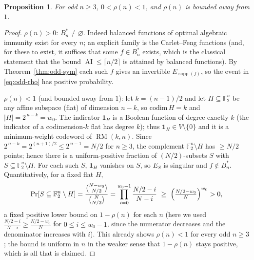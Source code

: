 \documentclass{amsart}
\newtheorem{proposition}[theorem]{Proposition}
\theoremstyle{definition}
\DeclareMathOperator{\AI}{AI}
\DeclareMathOperator{\supp}{supp}
\DeclareMathOperator{\RM}{RM}
\newcommand{\F}{\mathbb{F}}
\begin{document}
\begin{proposition}\label{prop:oddbounds}
For odd $n\ge3$, $0<\rho(n)<1$, and $\rho(n)$ is bounded away from $1$.
\end{proposition}
\begin{proof}
$\rho(n)>0$: $B_n^*\neq\varnothing$. Indeed balanced functions of optimal
algebraic immunity exist for every $n$; an explicit family is the
Carlet--Feng functions (and, for these to exist, it suffices that some
$f\in B_n^*$ exists, which is the classical statement that the bound
$\AI\le\lceil n/2\rceil$ is attained by balanced functions). By
Theorem~\ref{thm:odd-sym} each such $f$ gives an invertible $E_{\supp(f)}$,
so the event in \eqref{eq:odd-rho} has positive probability.

$\rho(n)<1$ (and bounded away from $1$): let $k=(n-1)/2$ and let
$H\subseteq\F_2^n$ be any affine subspace (flat) of dimension $n-k$, so
$\mathrm{codim}\,H=k$ and $|H|=2^{\,n-k}=w_0$. The indicator $\mathbf 1_H$
is a Boolean function of degree exactly $k$ (the indicator of a
codimension-$k$ flat has degree $k$); thus $\mathbf 1_H\in V\setminus\{0\}$
and it is a minimum-weight codeword of $\RM(k,n)$. Since
$2^{\,n-k}=2^{(n+1)/2}\le 2^{\,n-1}=N/2$ for $n\ge3$, the complement
$\F_2^n\setminus H$ has $\ge N/2$ points; hence there is a uniform-positive
fraction of $(N/2)$-subsets $S$ with $S\subseteq\F_2^n\setminus H$. For
each such $S$, $\mathbf 1_H$ vanishes on $S$, so $E_S$ is singular and
$f\notin B_n^*$. Quantitatively, for a fixed flat $H$,
\[
\Pr[S\subseteq\F_2^n\setminus H]=\frac{\binom{N-w_0}{N/2}}{\binom{N}{N/2}}
=\prod_{i=0}^{w_0-1}\frac{N/2-i}{N-i}
\ \ge\ \Bigl(\tfrac{N/2-w_0}{N}\Bigr)^{w_0}>0,
\]
a fixed positive lower bound on $1-\rho(n)$ for each $n$ (here we used
$\frac{N/2-i}{N-i}\ge\frac{N/2-w_0}{N}$ for $0\le i\le w_0-1$, since the
numerator decreases and the denominator increases with $i$). This already
shows $\rho(n)<1$ for every odd $n\ge3$; the bound is uniform in $n$ in the
weaker sense that $1-\rho(n)$ stays positive, which is all that is claimed.
\end{proof}
\end{document}
